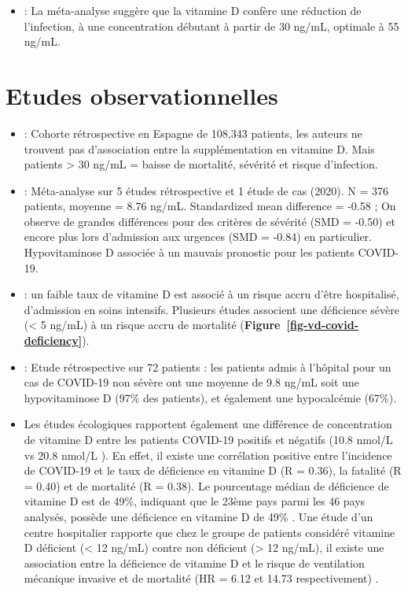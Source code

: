 \documentclass[
  a4paper,
  DIV=11,
  numbers=noendperiod,
  listof=totoc]{scrreprt}
\providecommand{\tightlist}{%
  \setlength{\itemsep}{0pt}\setlength{\parskip}{0pt}}\usepackage{longtable,booktabs,array}
\begin{document}
\begin{itemize}
\tightlist
\item
  \textcite{Borsche.2021}: La méta-analyse suggère que la vitamine D
  confère une réduction de l'infection, à une concentration débutant à
  partir de 30 ng/mL, optimale à 55 ng/mL.
\end{itemize}

\section{Etudes observationnelles}\label{etudes-observationnelles}

\begin{itemize}
\item
  \textcite{Oristrell.2022} : Cohorte rétrospective en Espagne de
  108,343 patients, les auteurs ne trouvent pas d'association entre la
  supplémentation en vitamine D. Mais patients \textgreater{} 30 ng/mL =
  baisse de mortalité, sévérité et risque d'infection.
\item
  \textcite{Munshi.2021} : Méta-analyse sur 5 études rétrospective et 1
  étude de cas (2020). N = 376 patients, moyenne = 8.76 ng/mL.
  Standardized mean difference = -0.58 ; On observe de grandes
  différences pour des critères de sévérité (SMD = -0.50) et encore plus
  lors d'admission aux urgences (SMD = -0.84) en particulier.
  Hypovitaminose D associée à un mauvais pronostic pour les patients
  COVID-19.
\item
  \textcite{Campi.2021} : un faible taux de vitamine D est associé à un
  risque accru d'être hospitalisé, d'admission en soins intensifs.
  Plusieurs études associent une déficience sévère (\textless{} 5 ng/mL)
  à un risque accru de mortalité
  (\textbf{Figure~\ref{fig-vd-covid-deficiency}}).
\item
  \textcite{Pal.2021} : Etude rétrospective sur 72 patients : les
  patients admis à l'hôpital pour un cas de COVID-19 non sévère ont une
  moyenne de 9.8 ng/mL soit une hypovitaminose D (97\% des patients), et
  également une hypocalcémie (67\%).
\item
  Les études écologiques rapportent également une différence de
  concentration de vitamine D entre les patients COVID-19 positifs et
  négatifs (10.8 nmol/L vs 20.8 nmol/L \autocite{Baktash.2021}). En
  effet, il existe une corrélation positive entre l'incidence de
  COVID-19 et le taux de déficience en vitamine D (R = 0.36), la
  fatalité (R = 0.40) et de mortalité (R = 0.38). Le pourcentage médian
  de déficience de vitamine D est de 49\%, indiquant que le 23ème pays
  parmi les 46 pays analysés, possède une déficience en vitamine D de
  49\% \autocite{Mariani.2021}. Une étude d'un centre hospitalier
  rapporte que chez le groupe de patients considéré vitamine D déficient
  (\textless{} 12 ng/mL) contre non déficient (\textgreater{} 12 ng/mL),
  il existe une association entre la déficience de vitamine D et le
  risque de ventilation mécanique invasive et de mortalité (HR = 6.12 et
  14.73 respectivement) \autocite{Radujkovic.2020}.
\end{itemize}
\end{document}
